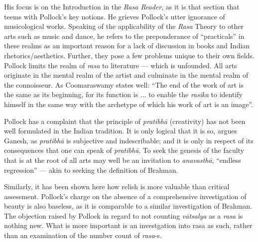 His focus is on the Introduction in the \textsl{Rasa Reader}, as it is that section that teems with Pollock’s key notions. He grieves Pollock’s utter ignorance of musicological works. Speaking of the applicability of the \textsl{Rasa} Theory to other arts such as music and dance, he refers to the preponderance of “practicals” in these realms as an important reason for a lack of discussion in books and Indian rhetorics/aesthetics. Further, they pose a few problems unique to their own fields. Pollock limits the realm of \textsl{rasa} to literature --- which is unfounded. All arts originate in the mental realm of the artist and culminate in the mental realm of the connoisseur. As Coomaraswamy states well: “The end of the work of art is the same as its beginning, for its function is ... to enable the \textsl{rasika} to identify himself in the same way with the archetype of which his work of art is an image”.

Pollock has a complaint that the principle of \textsl{pratibhā} (creativity) has not been well formulated  in the Indian tradition. It is only logical that it is so, argues Ganesh, as \textsl{pratibhā} is subjective and indescribable; and it is only in respect of its consequences that one can speak of \textsl{pratibhā}. To seek the genesis of the faculty that is at the root of all arts may well be an invitation to \textsl{anavasthā}, “endless regression” --- akin to seeking the definition of Brahman. 

Similarly, it has been shown here how relish is more valuable than critical assessment. Pollock’s charge on the absence of a comprehensive investigation of beauty is also baseless, as it is comparable to a similar investigation of Brahman. The objection raised by Pollock in regard to not counting \textsl{vātsalya} as a \textsl{rasa} is nothing new. What is more important is an investgation into rasa as such, rather than an examination of the number count of \textsl{rasa}-s.


